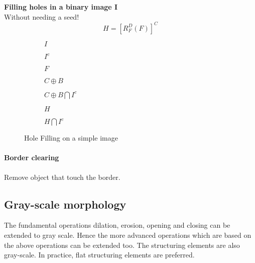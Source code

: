 \textbf{Filling holes in a binary image I}\\
Without needing a seed!\\
\[
	H = [R_F^D(F)]^C
\]
\begin{figure}[h!]
\centering
\begin{subfigure}[b]{0.13\textwidth}
\centering
{}
\caption{$I$}
\end{subfigure}
\begin{subfigure}[b]{0.13\textwidth}
\centering
{}
\caption{$I^c$}
\end{subfigure}
\begin{subfigure}[b]{0.13\textwidth}
\centering
{}
\caption{$F$}
\end{subfigure}
\begin{subfigure}[b]{0.13\textwidth}
\centering
{}
\caption{$C \oplus B$}
\end{subfigure}
\begin{subfigure}[b]{0.13\textwidth}
\centering
{}
\caption{$C \oplus B \bigcap I^c$}
\end{subfigure}
\begin{subfigure}[b]{0.13\textwidth}
\centering
{}
\caption{$H$}
\end{subfigure}
\begin{subfigure}[b]{0.13\textwidth}
\centering
{}
\caption{$H \bigcap I^c$}
\end{subfigure}
\caption{Hole Filling on a simple image}
\end{figure}

\paragraph{Border clearing}
Remove object that touch the border.

\subsection{Gray-scale morphology}
The fundamental operations dilation, erosion, opening and closing can be extended to gray scale. Hence the more advanced operations which are based on the above operations can be extended too. The structuring elements are also gray-scale. In practice, flat structuring elements are preferred.

